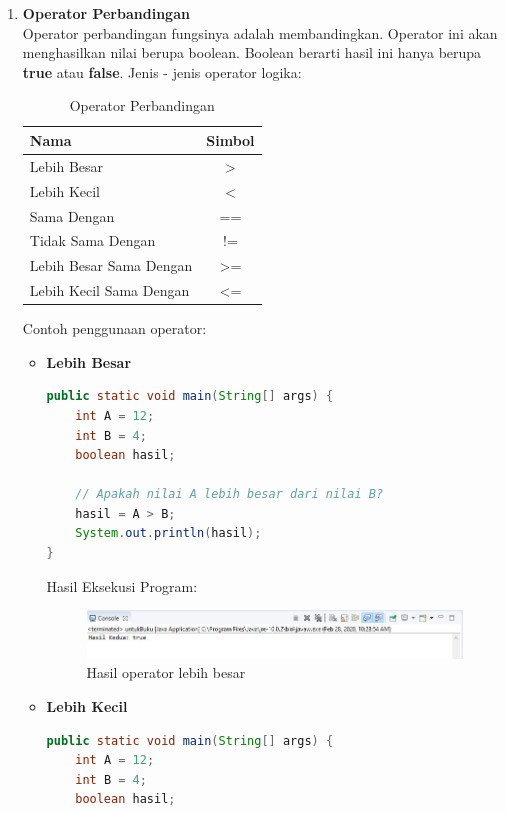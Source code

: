 \begin{enumerate}
\newpage
    \item \textbf{Operator Perbandingan}\\
    Operator perbandingan fungsinya adalah membandingkan. Operator ini akan menghasilkan nilai berupa boolean. Boolean berarti hasil ini hanya berupa \textbf{true} atau \textbf{false}. Jenis - jenis operator logika:
    \begin{table}[h!]
        \centering
        \begin{tabular}{|l|c|}
        \hline
        \rowcolor[HTML]{9AFF99} 
        \textbf{Nama}           & \multicolumn{1}{l|}{\cellcolor[HTML]{9AFF99}\textbf{Simbol}} \\ \hline
        Lebih Besar             & \textgreater{}                                               \\ \hline
        Lebih Kecil             & \textless{}                                                  \\ \hline
        Sama Dengan             & ==                                                           \\ \hline
        Tidak Sama Dengan       & !=                                                           \\ \hline
        Lebih Besar Sama Dengan & \textgreater{}=                                              \\ \hline
        Lebih Kecil Sama Dengan & \textless{}=                                                 \\ \hline
        \end{tabular}
        \caption{Operator Perbandingan}
        \end{table}

        Contoh penggunaan operator:
        \begin{itemize}
            \item \textbf{Lebih Besar}
            \begin{lstlisting}[language=Java]
public static void main(String[] args) {
    int A = 12;
    int B = 4;
    boolean hasil;
            
    // Apakah nilai A lebih besar dari nilai B?
    hasil = A > B;
    System.out.println(hasil);
}                
            \end{lstlisting}
            Hasil Eksekusi Program:
            \begin{figure}[htbp!]
                \centering
                \includegraphics[scale=0.6]{pictures/operator_perbandingan_lebih_besar.JPG}
                \caption{Hasil operator lebih besar}
                \label{}
            \end{figure}
            \newpage
            \item \textbf{Lebih Kecil}
            \begin{lstlisting}[language=Java]
public static void main(String[] args) {
    int A = 12;
    int B = 4;
    boolean hasil;


\end{lstlisting}
\end{itemize}
\end{enumerate}
